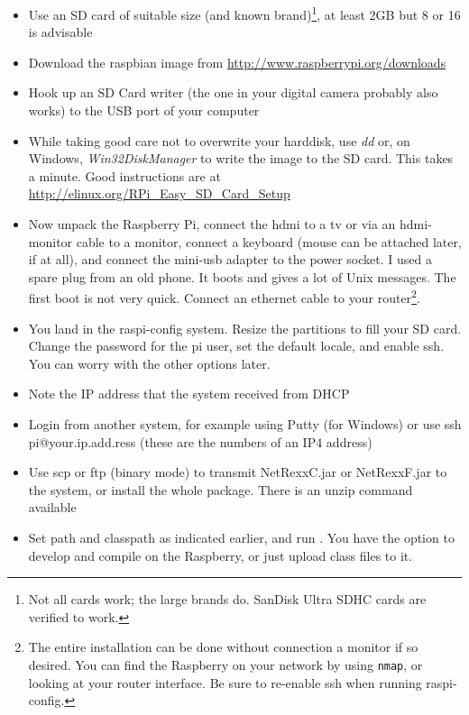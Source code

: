 \begin{itemize}
\item Use an SD card of suitable size (and known brand)\footnote{Not all cards work; the large brands do. SanDisk Ultra SDHC cards are verified to work.}, at least 2GB but 8 or 16 is advisable
\item Download the raspbian image from \url{http://www.raspberrypi.org/downloads}
\item Hook up an SD Card writer (the one in your digital camera probably also works) to the USB port of your computer
\item While taking good care not to overwrite your harddisk, use \emph{dd} or, on Windows, \emph{Win32DiskManager} to write the image to the SD card. This takes a minute. Good instructions are at \url{http://elinux.org/RPi_Easy_SD_Card_Setup}
\item Now unpack the Raspberry Pi, connect the hdmi to a tv or via an hdmi-monitor cable to a monitor, connect a keyboard (mouse can be attached later, if at all), and connect the mini-usb adapter to the power socket. I used a spare plug from an old phone. It boots and gives a lot of Unix messages. The first boot is not very quick. Connect an ethernet cable to your router\footnote{The entire installation can be done without connection a monitor if so desired. You can find the Raspberry on your network by using \texttt{nmap}, or looking at your router interface. Be sure to re-enable ssh when running raspi-config.}.
\item You land in the raspi-config system. Resize the partitions to fill your SD card. Change the password for the pi user, set the default locale, and enable ssh. You can worry with the other options later.
\item Note the IP address that the system received from DHCP
\item Login from another system, for example using Putty (for Windows) or use ssh pi@your.ip.add.ress (these are the numbers of an IP4 address)
\item Use scp or ftp (binary mode) to transmit NetRexxC.jar or
  NetRexxF.jar to the system, or install the whole \nr{} package. There is an unzip command available
\item Set path and classpath as indicated earlier, and run \nr{}. You have the option to develop and compile on the Raspberry, or just upload class files to it.
\end{itemize}
